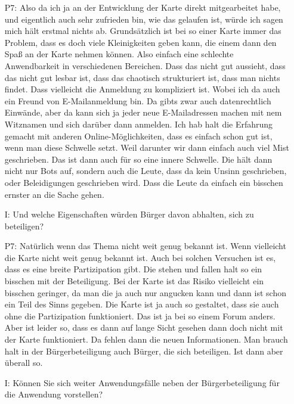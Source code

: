 \begin{itemize}
    \item[P7:] Also da ich ja an der Entwicklung der Karte direkt mitgearbeitet habe, und eigentlich auch sehr zufrieden bin, wie das gelaufen ist, w{\"u}rde ich sagen mich h{\"a}lt erstmal nichts ab. Grunds{\"a}tzlich ist bei so einer Karte immer das Problem, dass es doch viele Kleinigkeiten geben kann, die einem dann den Spa{\ss} an der Karte nehmen k{\"o}nnen. Also einfach eine schlechte Anwendbarkeit in verschiedenen Bereichen. Dass das nicht gut aussieht, dass das nicht gut lesbar ist, dass das chaotisch strukturiert ist, dass man nichts findet. Dass vielleicht die Anmeldung zu kompliziert ist. Wobei ich da auch ein Freund von E-Mailanmeldung bin. Da gibts zwar auch datenrechtlich Einw{\"a}nde, aber da kann sich ja jeder neue E-Mailadressen machen mit nem Witznamen und sich dar{\"u}ber dann anmelden. Ich hab halt die Erfahrung gemacht mit anderen Online-M{\"o}glichkeiten, dass es einfach schon gut ist, wenn man diese Schwelle setzt. Weil darunter wir dann einfach auch viel Mist geschrieben. Das ist dann auch f{\"u}r so eine innere Schwelle. Die h{\"a}lt dann nicht nur Bots auf, sondern auch die Leute, dass da kein Unsinn geschrieben, oder Beleidigungen geschrieben wird. Dass die Leute da einfach ein bisschen ernster an die Sache gehen.
    \item[I:] Und welche Eigenschaften w{\"u}rden B{\"u}rger davon abhalten, sich zu beteiligen?
    \item[P7:] Nat{\"u}rlich wenn das Thema nicht weit genug bekannt ist. Wenn vielleicht die Karte nicht weit genug bekannt ist. Auch bei solchen Versuchen ist es, dass es eine breite Partizipation gibt. Die stehen und fallen halt so ein bisschen mit der Beteiligung. Bei der Karte ist das Risiko vielleicht ein bisschen geringer, da man die ja auch nur angucken kann und dann ist schon ein Teil des Sinns gegeben. Die Karte ist ja auch so gestaltet, dass sie auch ohne die Partizipation funktioniert. Das ist ja bei so einem Forum anders. Aber ist leider so, dass es dann auf lange Sicht gesehen dann doch nicht mit der Karte funktioniert. Da fehlen dann die neuen Informationen. Man brauch halt in der B{\"u}rgerbeteiligung auch B{\"u}rger, die sich beteiligen. Ist dann aber {\"u}berall so.
    \item[I:] K{\"o}nnen Sie sich weiter Anwendungsf{\"a}lle neben der B{\"u}rgerbeteiligung f{\"u}r die Anwendung vorstellen?

\end{itemize}

